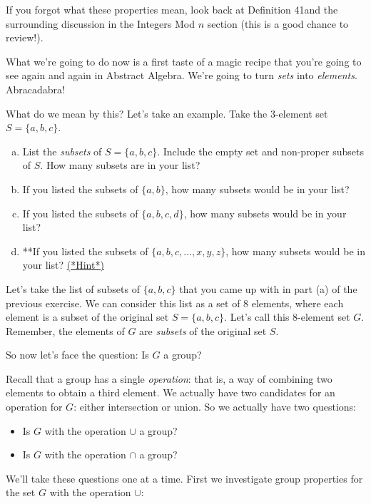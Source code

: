 \noindent
If you forgot what these properties mean, look back at Definition 41and the surrounding discussion in the Integers Mod $n$ section (this is a good chance to review!).

What we're going to do now is a first taste of a magic recipe that you're going to see again and again in Abstract Algebra. We're going to turn \emph{sets} into \emph{elements}. Abracadabra!

What do we mean by this? Let's take an example. Take the 3-element set $S = \{a,b,c\}$. 

\begin{exercise}{31}
\begin{enumerate}[(a)]
\item
List the \emph{subsets} of $S =  \{a,b,c\}$. Include the empty set and non-proper subsets of $S$. How many subsets are in your list?
\item
If you listed the subsets of $\{a,b\}$, how many subsets would be in your list?
\item
If you listed the subsets of $\{a,b,c,d\}$, how many subsets would be in your list?
\item
**If you listed the subsets of $\{a,b,c,\ldots,x,y,z\}$, how many subsets would be in your list?
\hyperref[sec:set_chapter:hints]{(*Hint*)}
\end{enumerate}
\end{exercise}

Let's take the list of subsets of $\{a,b,c\}$ that you came up with in part (a) of the previous exercise. We can consider this list as a set of 8 elements, where each element is a subset of the original set $S = \{a,b,c\}$. Let's call this 8-element set $G$. Remember, the elements of $G$ are \emph{subsets} of the original set $S$.

So now let's face the question:  Is $G$ a group? 

Recall that a group has a single \emph{operation}: that is, a way of combining two elements to obtain a third element. We actually have two candidates for an operation for $G$: either intersection or union. So we actually have two questions:
\begin{itemize}
\item
 Is $G$ with the operation $\cup$ a group?
\item
Is $G$ with the operation $\cap$ a group?
\end{itemize}

We'll take these questions one at a time. First we investigate group properties for the set $G$ with the operation $\cup$:

